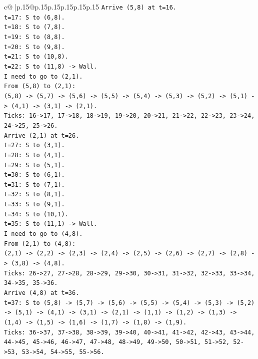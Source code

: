 \documentclass{article}
\begin{document}
{\begin{supertabular}{c@{$\;$}|p{.15\linewidth}@{}p{.15\linewidth}p{.15\linewidth}p{.15\linewidth}p{.15\linewidth}p{.15\linewidth}}
{{{\texttt{Arrive (5,8) at t=16.} \\
\texttt{t=17: S to (6,8).} \\
\texttt{t=18: S to (7,8).} \\
\texttt{t=19: S to (8,8).} \\
\texttt{t=20: S to (9,8).} \\
\texttt{t=21: S to (10,8).} \\
\texttt{t=22: S to (11,8) {-}> Wall.} \\
\texttt{I need to go to (2,1).} \\
\texttt{From (5,8) to (2,1):} \\
\texttt{(5,8) {-}> (5,7) {-}> (5,6) {-}> (5,5) {-}> (5,4) {-}> (5,3) {-}> (5,2) {-}> (5,1) {-}> (4,1) {-}> (3,1) {-}> (2,1).} \\
\texttt{Ticks: 16{-}>17, 17{-}>18, 18{-}>19, 19{-}>20, 20{-}>21, 21{-}>22, 22{-}>23, 23{-}>24, 24{-}>25, 25{-}>26.} \\
\texttt{Arrive (2,1) at t=26.} \\
\texttt{t=27: S to (3,1).} \\
\texttt{t=28: S to (4,1).} \\
\texttt{t=29: S to (5,1).} \\
\texttt{t=30: S to (6,1).} \\
\texttt{t=31: S to (7,1).} \\
\texttt{t=32: S to (8,1).} \\
\texttt{t=33: S to (9,1).} \\
\texttt{t=34: S to (10,1).} \\
\texttt{t=35: S to (11,1) {-}> Wall.} \\
\texttt{I need to go to (4,8).} \\
\texttt{From (2,1) to (4,8):} \\
\texttt{(2,1) {-}> (2,2) {-}> (2,3) {-}> (2,4) {-}> (2,5) {-}> (2,6) {-}> (2,7) {-}> (2,8) {-}> (3,8) {-}> (4,8).} \\
\texttt{Ticks: 26{-}>27, 27{-}>28, 28{-}>29, 29{-}>30, 30{-}>31, 31{-}>32, 32{-}>33, 33{-}>34, 34{-}>35, 35{-}>36.} \\
\texttt{Arrive (4,8) at t=36.} \\
\texttt{t=37: S to (5,8) {-}> (5,7) {-}> (5,6) {-}> (5,5) {-}> (5,4) {-}> (5,3) {-}> (5,2) {-}> (5,1) {-}> (4,1) {-}> (3,1) {-}> (2,1) {-}> (1,1) {-}> (1,2) {-}> (1,3) {-}> (1,4) {-}> (1,5) {-}> (1,6) {-}> (1,7) {-}> (1,8) {-}> (1,9).} \\
\texttt{Ticks: 36{-}>37, 37{-}>38, 38{-}>39, 39{-}>40, 40{-}>41, 41{-}>42, 42{-}>43, 43{-}>44, 44{-}>45, 45{-}>46, 46{-}>47, 47{-}>48, 48{-}>49, 49{-}>50, 50{-}>51, 51{-}>52, 52{-}>53, 53{-}>54, 54{-}>55, 55{-}>56.} \\
}}}
\end{supertabular}}
\end{document}

